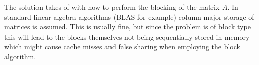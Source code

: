 The solution takes of with how to perform the blocking of the matrix $A$. In
standard linear algebra algorithms (BLAS for example) column major storage of
matrices is assumed. This is usually fine, but since the problem is of block
type this will lead to the blocks themselves not being sequentially stored in
memory which might cause cache misses and false sharing when employing the block
algorithm. 
